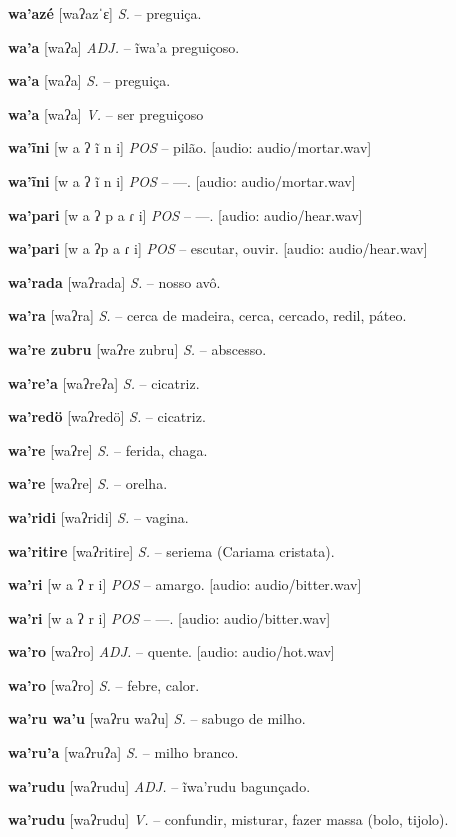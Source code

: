 \textbf{wa'azé} [waʔazˈɛ] \textit{S.} -- preguiça.

\textbf{wa'a} [waʔa] \textit{ADJ.} -- ĩwa'a preguiçoso.

\textbf{wa'a} [waʔa] \textit{S.} -- preguiça.

\textbf{wa'a} [waʔa] \textit{V.} -- {ser preguiçoso}

\textbf{wa'ĩni} [w a ʔ ĩ n i] \textit{POS} -- pilão. [audio: audio/mortar.wav]{\faHeadphones}

\textbf{wa'ĩni} [w a ʔ ĩ n i] \textit{POS} -- —. [audio: audio/mortar.wav]{\faHeadphones}

\textbf{wa'pari} [w a ʔ p a ɾ i] \textit{POS} -- —. [audio: audio/hear.wav]{\faHeadphones}

\textbf{wa'pari} [w a ʔp a ɾ i] \textit{POS} -- escutar, ouvir. [audio: audio/hear.wav]{\faHeadphones}

\textbf{wa'rada} [waʔrada] \textit{S.} -- nosso avô.

\textbf{wa'ra} [waʔra] \textit{S.} -- cerca de madeira, cerca, cercado, redil, páteo.

\textbf{wa're zubru} [waʔre zubru] \textit{S.} -- abscesso.

\textbf{wa're'a} [waʔreʔa] \textit{S.} -- cicatriz.

\textbf{wa'redö} [waʔredö] \textit{S.} -- cicatriz.

\textbf{wa're} [waʔre] \textit{S.} -- ferida, chaga.

\textbf{wa're} [waʔre] \textit{S.} -- orelha.

\textbf{wa'ridi} [waʔridi] \textit{S.} -- vagina.

\textbf{wa'ritire} [waʔritire] \textit{S.} -- seriema (Cariama cristata).

\textbf{wa'ri} [w a ʔ r i] \textit{POS} -- amargo. [audio: audio/bitter.wav]{\faHeadphones}

\textbf{wa'ri} [w a ʔ r i] \textit{POS} -- —. [audio: audio/bitter.wav]{\faHeadphones}

\textbf{wa'ro} [waʔro] \textit{ADJ.} -- quente. [audio: audio/hot.wav]{\faHeadphones}

\textbf{wa'ro} [waʔro] \textit{S.} -- febre, calor.

\textbf{wa'ru wa'u} [waʔru waʔu] \textit{S.} -- sabugo de milho.

\textbf{wa'ru'a} [waʔruʔa] \textit{S.} -- milho branco.

\textbf{wa'rudu} [waʔrudu] \textit{ADJ.} -- ĩwa'rudu bagunçado.

\textbf{wa'rudu} [waʔrudu] \textit{V.} -- confundir, misturar, fazer massa (bolo, tijolo).

